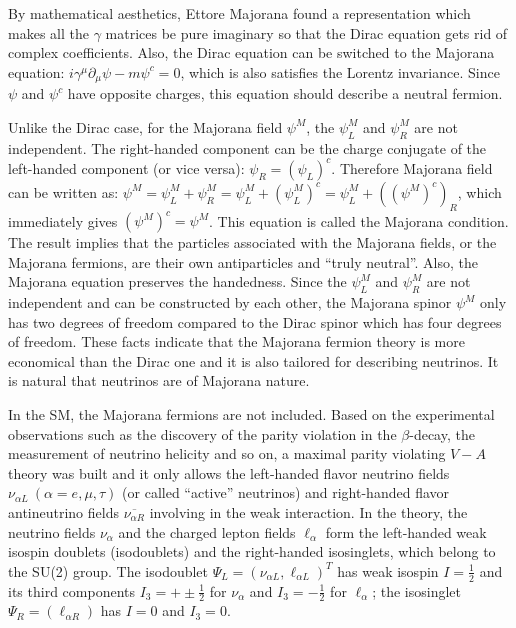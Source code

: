 By mathematical aesthetics, Ettore Majorana found a representation which makes all the $\gamma$ matrices be pure imaginary so that the Dirac equation gets rid of complex coefficients\cite{majorana2006symmetric}. Also, the Dirac equation can be switched to the Majorana equation: $i\gamma^\mu\partial_\mu\psi-m\psi^c=0$, which is also satisfies the Lorentz invariance\cite{zee2010quantum}. Since $\psi$ and $\psi^c$ have opposite charges, this equation should describe a neutral fermion\cite{zee2010quantum}. 

Unlike the Dirac case, for the Majorana field $\psi^M$, the $\psi^M_L$ and $\psi^M_R$ are not independent. The right-handed component can be the charge conjugate of the left-handed component (or vice versa): $\psi_R=(\psi_L)^c$\cite{akhmedov2014majorana}. Therefore Majorana field can be written as: $\psi^M=\psi_L^M+\psi_R^M=\psi^M_L+(\psi^M_L)^c=\psi^M_L+((\psi^M)^c)_R$, which immediately gives $(\psi^M)^c=\psi^M$. This equation is called the Majorana condition. The result implies that the particles associated with the Majorana fields, or the Majorana fermions, are their own antiparticles and ``truly neutral''\cite{akhmedov2014majorana}. Also, the Majorana equation preserves the handedness\cite{zee2010quantum}. Since the $\psi^M_L$ and $\psi^M_R$ are not independent and can be constructed by each other, the Majorana spinor $\psi^M$ only has two degrees of freedom compared to the Dirac spinor which has four degrees of freedom. These facts indicate that the Majorana fermion theory is more economical than the Dirac one and it is also tailored for describing neutrinos. It is natural that neutrinos are of Majorana nature.

In the SM, the Majorana fermions are not included. Based on the experimental observations such as the discovery of the parity violation in the $\beta$-decay\cite{wu1957experimental}, the measurement of neutrino helicity\cite{goldhaber1958helicity} and so on, a maximal parity violating $V-A$ theory was built and it only allows the left-handed flavor neutrino fields $\nu_{\alpha L}~(\alpha=e,\mu,\tau)$ (or called ``active'' neutrinos) and right-handed flavor antineutrino fields $\overline{\nu_{\alpha R}}$ involving in the weak interaction. In the theory, the neutrino fields $\nu_\alpha$ and the charged lepton fields $\ell_\alpha$ form the left-handed weak isospin doublets (isodoublets) and the right-handed isosinglets, which belong to the SU(2) group. The isodoublet $\Psi_L = (\nu_{\alpha L}, \ell_{\alpha L})^T$ has weak isospin $I=\frac{1}{2}$ and its third components $I_3=+\pm \frac{1}{2}$ for $\nu_\alpha$ and $I_3=-\frac{1}{2}$ for $\ell_\alpha$; the isosinglet $\Psi_R = (\ell_{\alpha R})$ has $I=0$ and $I_3=0$\cite{aitchison2012gauge, greiner2012theoretical}.

